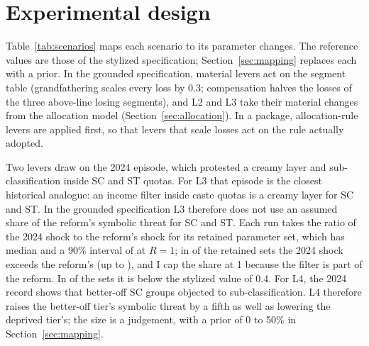\documentclass[11pt,a4paper]{article}
\begin{document}
\section{Experimental design}
\label{sec:design}

Table~\ref{tab:scenarios} maps each scenario to its parameter changes. The reference values are those of the stylized specification; Section~\ref{sec:mapping} replaces each with a prior. In the grounded specification, material levers act on the segment table (grandfathering scales every loss by 0.3; compensation halves the losses of the three above-line losing segments), and L2 and L3 take their material changes from the allocation model (Section~\ref{sec:allocation}). In a package, allocation-rule levers are applied first, so that levers that scale losses act on the rule actually adopted.

Two levers draw on the 2024 episode, which protested a creamy layer and sub-classification inside SC and ST quotas. For L3 that episode is the closest historical analogue: an income filter inside caste quotas is a creamy layer for SC and ST. In the grounded specification L3 therefore does not use an assumed share of the reform's symbolic threat for SC and ST. Each run takes the ratio of the 2024 shock to the reform's shock for its retained parameter set, which has median \LThreeRetainedMedian{} and a 90\% interval of \LThreeRetainedInterval{} at $R=1$; in \LThreeRetainedCappedShare{} of the retained sets the 2024 shock exceeds the reform's (up to \LThreeRetainedUncapped), and I cap the share at 1 because the filter is part of the reform. In \LThreeRetainedBelowReference{} of the sets it is below the stylized value of 0.4. For L4, the 2024 record shows that better-off SC groups objected to sub-classification. L4 therefore raises the better-off tier's symbolic threat by a fifth as well as lowering the deprived tier's; the size is a judgement, with a prior of 0 to 50\% in Section~\ref{sec:mapping}.
\end{document}
